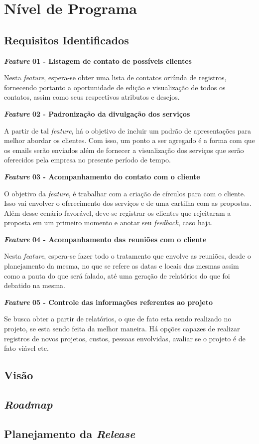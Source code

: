 \chapter[Nível de Programa]{Nível de Programa}

\section{Requisitos Identificados}

\textbf{\textit{Feature} 01 - Listagem de contato de possíveis clientes}

Nesta \textit{feature}, espera-se obter uma lista de contatos oriúnda de registros, fornecendo portanto a oportunidade de edição e visualização de todos os contatos, assim como seus respectivos atributos e desejos.



\textbf{\textit{Feature} 02 - Padronização da divulgação dos serviços}

A partir de tal \textit{feature}, há o objetivo de incluir um padrão de apresentações para melhor abordar os clientes. Com isso, um ponto a ser agregado é a forma com que os emails serão enviados além de fornecer a visualização dos serviços que serão oferecidos pela empresa no presente período de tempo.



\textbf{\textit{Feature} 03 - Acompanhamento do contato com o cliente}

O objetivo da \textit{feature}, é trabalhar com a criação de círculos para com o cliente. Isso vai envolver o oferecimento dos serviços e de uma cartilha com as propostas. Além desse cenário favorável, deve-se registrar os clientes que rejeitaram a proposta em um primeiro momento e anotar seu \textit{feedback}, caso haja.
		



\textbf{\textit{Feature} 04 - Acompanhamento das reuniões com o cliente}

Nesta \textit{feature}, espera-se fazer todo o tratamento que envolve as reuniões, desde o planejamento da mesma, no que se refere as datas e locais das mesmas assim como a pauta do que será falado, até uma geração de relatórios do que foi debatido na mesma.		



\textbf{\textit{Feature} 05 - Controle das informações referentes ao projeto}

Se busca obter a partir de relatórios, o que de fato esta sendo realizado no projeto, se esta sendo feita da melhor maneira. Há opções capazes de realizar registros de novos projetos, custos, pessoas envolvidas, avaliar se o projeto é de fato viável etc.



\section{Visão}

\section{\textit{Roadmap}}

\section{Planejamento da \textit{Release}}